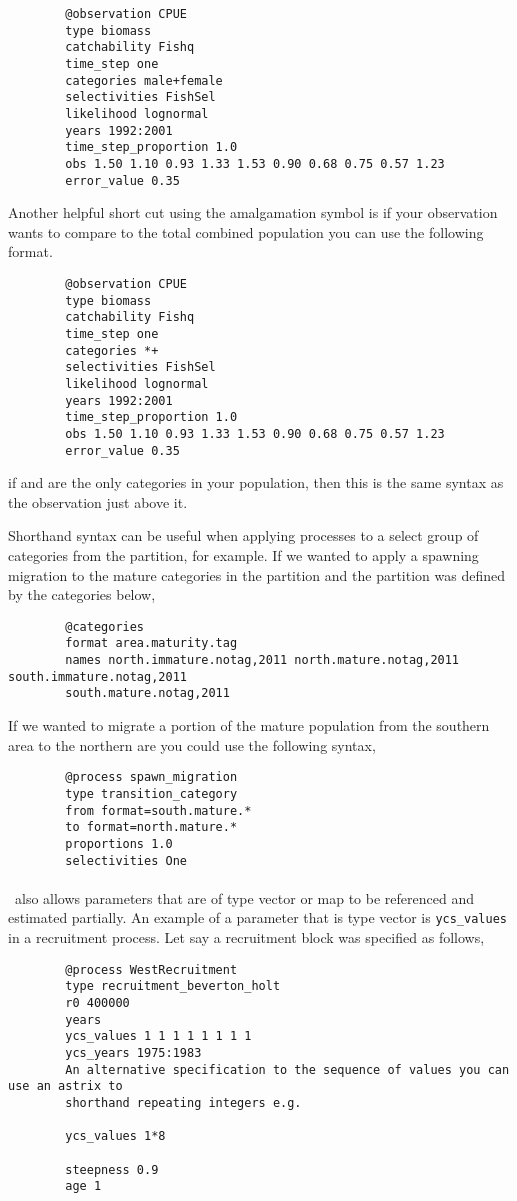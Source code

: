 {\small{\begin{verbatim}
		@observation CPUE
		type biomass
		catchability Fishq
		time_step one
		categories male+female
		selectivities FishSel
		likelihood lognormal
		years 1992:2001
		time_step_proportion 1.0
		obs 1.50 1.10 0.93 1.33 1.53 0.90 0.68 0.75 0.57 1.23
		error_value 0.35
		\end{verbatim}}}

Another helpful short cut using the amalgamation symbol \subcommand{+} is if your observation wants to compare to the total combined population you can use the following format.

{\small{\begin{verbatim}
		@observation CPUE
		type biomass
		catchability Fishq
		time_step one
		categories *+
		selectivities FishSel
		likelihood lognormal
		years 1992:2001
		time_step_proportion 1.0
		obs 1.50 1.10 0.93 1.33 1.53 0.90 0.68 0.75 0.57 1.23
		error_value 0.35
		\end{verbatim}}}

if  and  are the only categories in your population, then this is the same syntax as the observation just above it.

Shorthand syntax can be useful when applying processes to a select group of categories from the partition, for example. If we wanted to apply a spawning migration to the mature categories in the partition and the partition was defined by the categories below,
{\small{\begin{verbatim}
		@categories 
		format area.maturity.tag
		names north.immature.notag,2011 north.mature.notag,2011 south.immature.notag,2011
		south.mature.notag,2011		
		\end{verbatim}}}	

If we wanted to migrate a portion of the mature population from the southern area to the northern are you could use the following syntax,

{\small{\begin{verbatim}
		@process spawn_migration
		type transition_category 		
		from format=south.mature.*	
		to format=north.mature.*
		proportions 1.0
		selectivities One
		\end{verbatim}}}


\paragraph*{\label{sec:params}}
\CNAME\ also allows parameters that are of type vector or map to be referenced and estimated partially. An example of a parameter that is type vector is \texttt{ycs\_values} in a recruitment process. Let say a recruitment block was specified as follows,
{\small{\begin{verbatim}
		@process WestRecruitment
		type recruitment_beverton_holt
		r0 400000
		years
		ycs_values 1 1 1 1 1 1 1 1 
		ycs_years 1975:1983
		An alternative specification to the sequence of values you can use an astrix to
		shorthand repeating integers e.g.
		
		ycs_values 1*8
		
		steepness 0.9
		age 1
		\end{verbatim}}}

